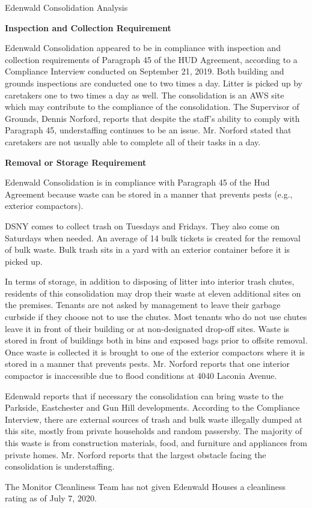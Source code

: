 Edenwald Consolidation Analysis

\textbf{Inspection and Collection Requirement}

Edenwald Consolidation appeared to be in compliance with inspection and collection requirements of Paragraph 45 of the HUD Agreement, according to a Compliance Interview conducted on September 21, 2019. Both building and grounds inspections are conducted one to two times a day. Litter is picked up by caretakers one to two times a day as well. The consolidation is an AWS site which may contribute to the compliance of the consolidation. The Supervisor of Grounds, Dennis Norford, reports that despite the staff's ability to comply with Paragraph 45, understaffing continues to be an issue. Mr. Norford stated that caretakers are not usually able to complete all of their tasks in a day.  

\textbf{Removal or Storage Requirement}

Edenwald Consolidation is in compliance with Paragraph 45 of the Hud Agreement because waste can be stored in a manner that prevents pests (e.g., exterior compactors).

DSNY comes to collect trash on Tuesdays and Fridays. They also come on Saturdays when needed. An average of 14 bulk tickets is created for the removal of bulk waste. Bulk trash sits in a yard with an exterior container before it is picked up.

In terms of storage, in addition to disposing of litter into interior trash chutes, residents of this consolidation may drop their waste at eleven additional sites on the premises. Tenants are not asked by management to leave their garbage curbside if they choose not to use the chutes. Most tenants who do not use chutes leave it in front of their building or at non-designated drop-off sites. Waste is stored in front of buildings both in bins and exposed bags prior to offsite removal. Once waste is collected it is brought to one of the exterior compactors where it is stored in a manner that prevents pests. Mr. Norford reports that one interior compactor is inaccessible due to flood conditions at 4040 Laconia Avenue.

Edenwald reports that if necessary the consolidation can bring waste to the Parkside, Eastchester and Gun Hill developments. According to the Compliance Interview, there are external sources of trash and bulk waste illegally dumped at this site, mostly from private households and random passersby. The majority of this waste is from construction materials, food, and furniture and appliances from private homes. Mr. Norford reports that the largest obstacle facing the consolidation is understaffing. 

The Monitor Cleanliness Team has not given Edenwald Houses a cleanliness rating as of July 7, 2020. 